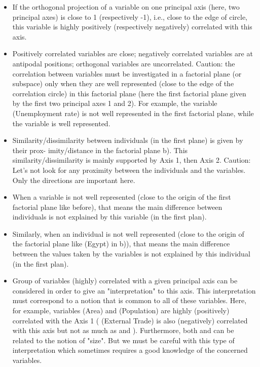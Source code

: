\documentclass[
  11pt,
  a4paper,
]{article}
\begin{document}
\begin{itemize}
\item If the orthogonal projection of a variable on one principal axis (here,
two principal axes) is close to 1 (respectively -1), i.e., close to the edge of
circle, this variable is highly positively (respectively negatively) correlated with this axis.
\item Positively correlated variables are close; negatively correlated variables are at antipodal positions; orthogonal variables are uncorrelated.
Caution: the correlation between variables must be investigated in a factorial plane (or subspace) only when they are well represented (close to the edge of the correlation circle) in this factorial plane (here the first factorial plane given by the first two principal axes 1 and 2). For example, the variable  (Unemployment rate) is not well represented in the first factorial plane, while the variable  is well represented.
\item Similarity/dissimilarity between individuals (in the first plane) is given by their prox- imity/distance in the factorial plane b). This similarity/dissimilarity is mainly supported by Axis 1, then Axis 2.
Caution: Let's not look for any proximity between the individuals and the variables. Only the directions are important here.
\item When a variable is not well represented (close to the origin of the first factorial plane like  before), that means the main difference between individuals is not explained by this variable (in the first plan).
\item Similarly, when an individual is not well represented (close to the origin of the factorial plane like  (Egypt) in b)), that means the main difference between the values taken by the variables is not explained by this individual (in the first plan).
\item Group of variables (highly) correlated with a given principal axis can be considered in order to give an "interpretation" to this axis. This interpretation must correspond to a notion that is common to all of these variables. Here, for example, variables  (Area) and 
 (Population) are highly (positively) correlated with the Axis 1 (
(External Trade) is also (negatively) correlated with this axis but not as much as  
and ). Furthermore, both  and  
can be related to the notion of "size".
But we must be careful with this type of interpretation which sometimes requires a good knowledge of the concerned variables.
\end{itemize}
\end{document}
